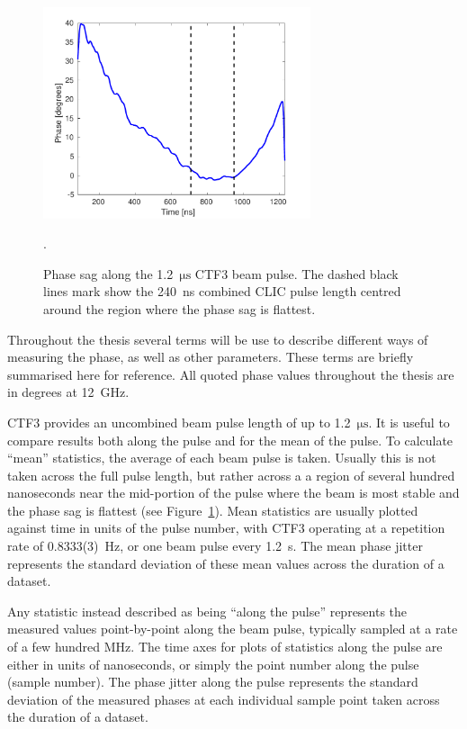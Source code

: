 \begin{figure}
  \centering
  \includegraphics[width=0.7\textwidth]{Figures/introduction/phaseSag}
  \caption{Phase sag along the 1.2~\(\mathrm{\mu s}\) CTF3 beam pulse. The dashed black lines mark show the 240~ns combined CLIC pulse length centred around the region where the phase sag is flattest.}.
  \label{f:ctfPhaseSag}
\end{figure}


Throughout the thesis several terms will be use to describe different ways of measuring the phase, as well as other parameters. These terms are briefly summarised here for reference. All quoted phase values throughout the thesis are in degrees at 12~GHz.

CTF3 provides an uncombined beam pulse length of up to 1.2~\(\mathrm{\mu s}\). It is useful to compare results both along the pulse and for the mean of the pulse. To calculate ``mean'' statistics, the average of each beam pulse is taken. Usually this is not taken across the full pulse length, but rather across a a region of several hundred nanoseconds near the mid-portion of the pulse where the beam is most stable and the phase sag is flattest (see Figure~\ref{f:ctfPhaseSag}). Mean statistics are usually plotted against time in units of the pulse number, with CTF3 operating at a repetition rate of 0.8333(3)~Hz, or one beam pulse every 1.2~s. The mean phase jitter represents the standard deviation of these mean values across the duration of a dataset.

Any statistic instead described as being ``along the pulse'' represents the measured values point-by-point along the beam pulse, typically sampled at a rate of a few hundred MHz. The time axes for plots of statistics along the pulse are either in units of nanoseconds, or simply the point number along the pulse (sample number). The phase jitter along the pulse represents the standard deviation of the measured phases at each individual sample point taken across the duration of a dataset.

